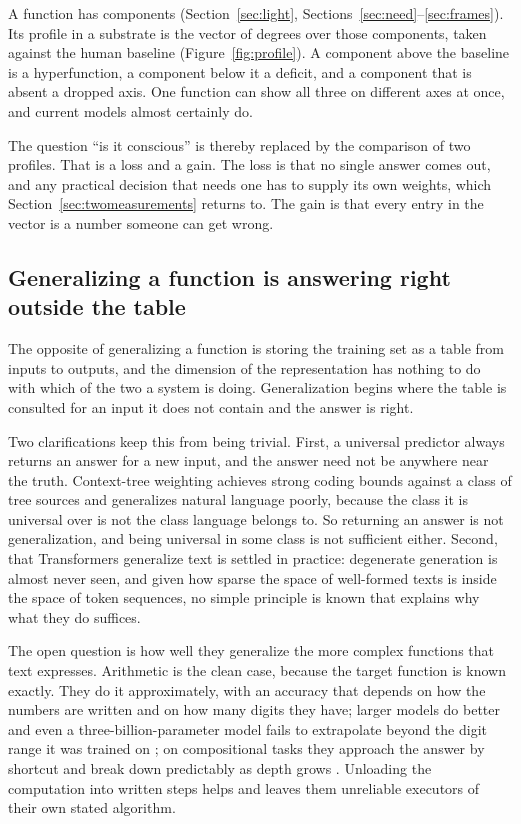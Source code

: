 A function has components (Section~\ref{sec:light}, Sections~\ref{sec:need}--\ref{sec:frames}). Its
profile in a substrate is the vector of degrees over those components, taken against the human baseline
(Figure~\ref{fig:profile}). A component above the baseline is a hyperfunction, a component below it a deficit, and a component that
is absent a dropped axis. One function can show all three on different axes at once, and current models
almost certainly do.

The question ``is it conscious'' is thereby replaced by the comparison of two profiles. That is a loss
and a gain. The loss is that no single answer comes out, and any practical decision that needs one has to
supply its own weights, which Section~\ref{sec:twomeasurements} returns to. The gain is that every entry in the vector is a number
someone can get wrong.

\subsection{Generalizing a function is answering right outside the table}
\label{sec:memorization}

The opposite of generalizing a function is storing the training set as a table from inputs to outputs,
and the dimension of the representation has nothing to do with which of the two a system is doing.
Generalization begins where the table is consulted for an input it does not contain and the answer is
right.

Two clarifications keep this from being trivial. First, a universal predictor always returns an answer
for a new input, and the answer need not be anywhere near the truth. Context-tree weighting achieves
strong coding bounds against a class of tree sources \citep{willems1995} and generalizes natural language
poorly, because the class it is universal over is not the class language belongs to. So returning an
answer is not generalization, and being universal in some class is not sufficient either. Second, that
Transformers generalize text is settled in practice: degenerate generation is almost never seen, and
given how sparse the space of well-formed texts is inside the space of token sequences, no simple
principle is known that explains why what they do suffices.

The open question is how well they generalize the more complex functions that text expresses.
Arithmetic is the clean case, because the target function is known exactly. They do it approximately,
with an accuracy that depends on how the numbers are written and on how many digits they have; larger
models do better and even a three-billion-parameter model fails to extrapolate beyond the digit range it
was trained on \citep{nogueira2021}; on compositional tasks they approach the answer by shortcut and break down
predictably as depth grows \citep{dziri2023}. Unloading the computation into written steps helps and
leaves them unreliable executors of their own stated algorithm.

